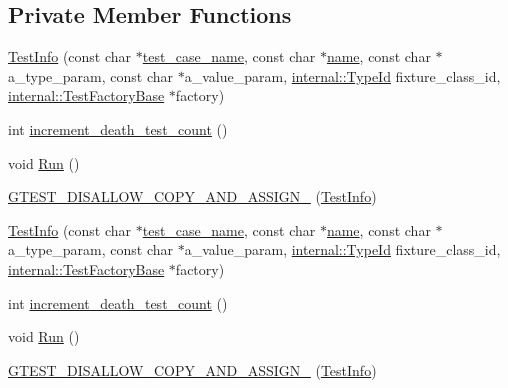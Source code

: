 \subsection*{\-Private \-Member \-Functions}
\begin{DoxyCompactItemize}
\item 
\hyperlink{classtesting_1_1TestInfo_a0ae5a655af57666d13da019245a93ae3}{\-Test\-Info} (const char $\ast$\hyperlink{classtesting_1_1TestInfo_a609cb6e3ffe274a79ede3c16fe92dc17}{test\-\_\-case\-\_\-name}, const char $\ast$\hyperlink{classtesting_1_1TestInfo_a862958aa3c2b9bf36903f1f0f2e81c54}{name}, const char $\ast$a\-\_\-type\-\_\-param, const char $\ast$a\-\_\-value\-\_\-param, \hyperlink{namespacetesting_1_1internal_ac8e91f0c6a06c0361dc3152ddfeb2342}{internal\-::\-Type\-Id} fixture\-\_\-class\-\_\-id, \hyperlink{classtesting_1_1internal_1_1TestFactoryBase}{internal\-::\-Test\-Factory\-Base} $\ast$factory)
\item 
int \hyperlink{classtesting_1_1TestInfo_ab32dced99547d83699c327dc67d45f96}{increment\-\_\-death\-\_\-test\-\_\-count} ()
\item 
void \hyperlink{classtesting_1_1TestInfo_aa3eca255b6be227d7d901cc2a72017a5}{\-Run} ()
\item 
\hyperlink{classtesting_1_1TestInfo_a93f1c5c860fc105e82b2bde1468e126c}{\-G\-T\-E\-S\-T\-\_\-\-D\-I\-S\-A\-L\-L\-O\-W\-\_\-\-C\-O\-P\-Y\-\_\-\-A\-N\-D\-\_\-\-A\-S\-S\-I\-G\-N\-\_\-} (\hyperlink{classtesting_1_1TestInfo}{\-Test\-Info})
\item 
\hyperlink{classtesting_1_1TestInfo_a0ae5a655af57666d13da019245a93ae3}{\-Test\-Info} (const char $\ast$\hyperlink{classtesting_1_1TestInfo_a609cb6e3ffe274a79ede3c16fe92dc17}{test\-\_\-case\-\_\-name}, const char $\ast$\hyperlink{classtesting_1_1TestInfo_a862958aa3c2b9bf36903f1f0f2e81c54}{name}, const char $\ast$a\-\_\-type\-\_\-param, const char $\ast$a\-\_\-value\-\_\-param, \hyperlink{namespacetesting_1_1internal_ac8e91f0c6a06c0361dc3152ddfeb2342}{internal\-::\-Type\-Id} fixture\-\_\-class\-\_\-id, \hyperlink{classtesting_1_1internal_1_1TestFactoryBase}{internal\-::\-Test\-Factory\-Base} $\ast$factory)
\item 
int \hyperlink{classtesting_1_1TestInfo_ab32dced99547d83699c327dc67d45f96}{increment\-\_\-death\-\_\-test\-\_\-count} ()
\item 
void \hyperlink{classtesting_1_1TestInfo_aa3eca255b6be227d7d901cc2a72017a5}{\-Run} ()
\item 
\hyperlink{classtesting_1_1TestInfo_a93f1c5c860fc105e82b2bde1468e126c}{\-G\-T\-E\-S\-T\-\_\-\-D\-I\-S\-A\-L\-L\-O\-W\-\_\-\-C\-O\-P\-Y\-\_\-\-A\-N\-D\-\_\-\-A\-S\-S\-I\-G\-N\-\_\-} (\hyperlink{classtesting_1_1TestInfo}{\-Test\-Info})
\end{DoxyCompactItemize}
